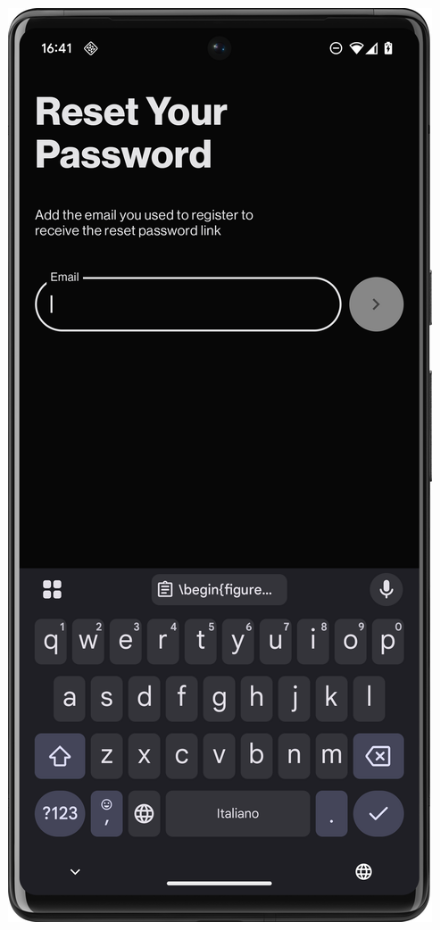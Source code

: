 \begin{figure}[H]
\begin{minipage}{0.24\textwidth}
        \label{fig:signup}
    \end{minipage}
    \hfill
    \begin{minipage}{0.24\textwidth}
        \centering
        \includegraphics[width=\textwidth]{foto/forgot_password}
        \label{fig:forgot_password}
    \end{minipage}
\end{figure}

